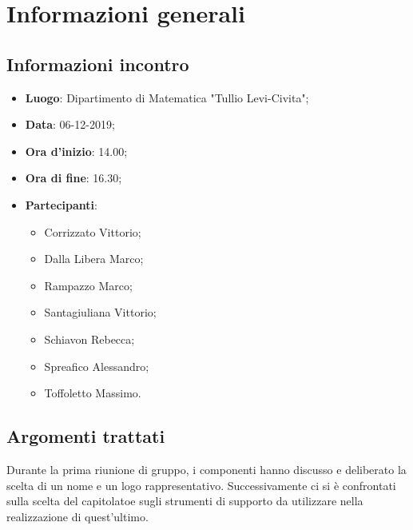 \section{Informazioni generali}
    \subsection{Informazioni incontro}
        \begin{itemize}
            \item \textbf{Luogo}: Dipartimento di Matematica "Tullio Levi-Civita";
            \item \textbf{Data}: 06-12-2019;
            \item \textbf{Ora d'inizio}: 14.00;
            \item \textbf{Ora di fine}: 16.30;
            \item \textbf{Partecipanti}: \begin{itemize}
                \item Corrizzato Vittorio;
                \item Dalla Libera Marco;
                \item Rampazzo Marco;
                \item Santagiuliana Vittorio;
                \item Schiavon Rebecca;
                \item Spreafico Alessandro;
                \item Toffoletto Massimo.
            \end{itemize}
        \end{itemize}
    \subsection{Argomenti trattati}
        Durante la prima riunione di gruppo, i componenti hanno discusso e deliberato la scelta di un nome e un logo rappresentativo.
        Successivamente ci si è confrontati sulla scelta del capitolato\glo e sugli strumenti di supporto da utilizzare nella realizzazione
        di quest'ultimo.
